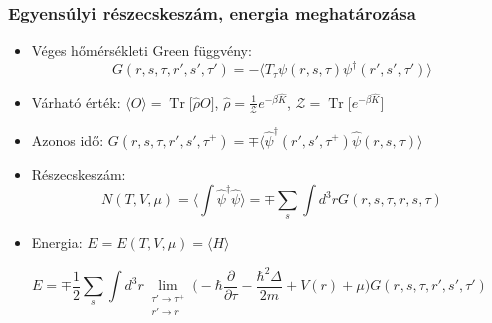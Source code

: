 \documentclass{beamer}
\DeclareMathOperator{\Tr}{Tr}
\begin{document}
\begin{frame}
\frametitle{Egyensúlyi részecskeszám, energia meghatározása}
\begin{itemize}
  \setlength{\itemsep}{10pt}
	
	\item Véges hőmérsékleti Green függvény: 
	\begin{equation}
	G(r, s, \tau, r', s', \tau')=-\big\langle T_\tau {\psi(r,s, \tau)\psi^\dagger(r',s',\tau')}\big\rangle
	\end{equation}
	
	\item Várható érték: $\langle O \rangle = \Tr\big[\hat{\rho} O\big]$,  $\hat{\rho}=\frac{1}{\mathcal{Z}}e^{-\beta\hat{K}}$, $\mathcal{Z}=\Tr{\big[e^{-\beta 
	\hat{K}}\big]}$
	\item Azonos idő: $G(r,s,\tau, r',s',\tau^+) = \mp\langle  \hat{\psi}^\dagger(r',s',\tau^+) \hat{\psi}(r,s,\tau) \rangle$
	
	\item Részecskeszám: 
	\begin{equation*}
	N(T,V,\mu) = \Big\langle \int \hat{\psi}^\dagger\hat{\psi}\Big \rangle= \mp \sum_s\int d^3r G(r,s,\tau, r, s, \tau)
	\end{equation*}

	\item Energia: $E=E(T,V,\mu) = \langle H \rangle$ 
		\end{itemize}

	\begin{equation*}
	E=\mp\frac{1}{2}\sum_s\int d^3r \lim_{\substack{\tau'\rightarrow\tau^+\\ r'\rightarrow r}} \bigg(-\hbar\frac{\partial}{\partial \tau}-\frac{\hbar^2\Delta}{2m}+V(r)+\mu\bigg)G(r,s,\tau, r', s', \tau')
	\end{equation*}
	
\end{frame}
\end{document}
